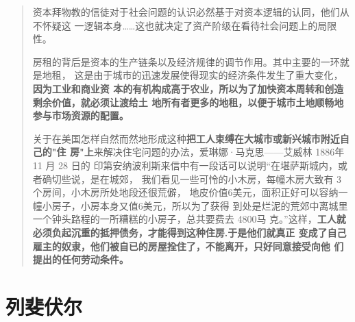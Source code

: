 \begin{quotation}
  资本拜物教的信徒对于社会问题的认识必然基于对资本逻辑的认同，他们从不怀疑这
  一逻辑本身……这也就决定了资产阶级在看待社会问题上的局限
  性。\cite[100]{zhuzhaiwenti}

  房租的背后是资本的生产链条以及经济规律的调节作用。其中主要的一环就是地租，
  这是由于城市的迅速发展使得现实的经济条件发生了重大变化，\textbf{因为工业和商业资
    本的有机构成高于农业，所以为了加快资本周转和创造剩余价值，就必须让渡给土
    地所有者更多的地租，以便于城市土地顺畅地参与市场资源的配置。}

  关于在美国怎样自然而然地形成这种\textbf{把工人束缚在大城市或新兴城市附近自己的"住
    房"上}来解决住宅问题的办法，爱琳娜·马克思——艾威林 1886年11 月 28 日的
  印第安纳波利斯来信中有一段话可以说明“在堪萨斯城内，或者确切些说，是在城郊，
  我们看见一些可怜的小木房，每幢木房大致有 3 个房间，小木房所处地段还很荒僻，
  地皮价值6美元，面积正好可以容纳一幢小房子，小房本身又值6美元，所以为了获得
  到处是烂泥的荒郊中离城里一个钟头路程的一所糟糕的小房子，总共要费去 4800马
  克。”这样，\textbf{工人就必须负起沉重的抵押债务，才能得到这种住房.于是他们就真正
    变成了自己雇主的奴隶，他们被自已的房屋拴住了，不能离开，只好同意接受向他
    们提出的任何劳动条件。}
\end{quotation}



\section{列斐伏尔}

